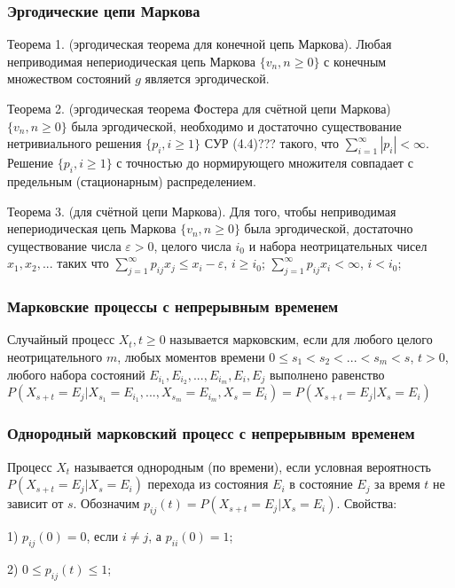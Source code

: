 \subsubsection*{Эргодические цепи Маркова}

Теорема 1. (эргодическая теорема для конечной цепь Маркова). Любая неприводимая непериодическая цепь Маркова $\{v_n, n\geq 0 \}$ с конечным множеством состояний $g$ является эргодической.

Теорема 2. (эргодическая теорема Фостера для счётной цепи Маркова) $\{v_n, n \geq 0 \}$ была эргодической, необходимо и достаточно существование нетривиального решения $\{p_i, i \geq 1 \}$ СУР (4.4)??? такого, что $\sum_{i=1}^\infty |p_i|<\infty$.
Решение $\{p_i, i \geq 1 \}$ с точностью до нормирующего множителя совпадает с предельным (стационарным) распределением.

Теорема 3. (для счётной цепи Маркова). Для того, чтобы  неприводимая непериодическая цепь Маркова $\{v_n, n\geq 0 \}$ была эргодической, достаточно существование числа $\varepsilon > 0$, целого числа $i_0$ и набора неотрицательных чисел $x_1,x_2,...$ таких что
$\sum_{j=1}^\infty p_{ij} x_j \leq x_i - \varepsilon$, $i \geq i_0$;
$\sum_{j=1}^\infty p_{ij} x_i < \infty$, $i < i_0$;

\subsubsection*{Марковские процессы с непрерывным временем}

Случайный процесс $X_t, t \geq 0$ называется марковским, если для любого целого неотрицательного $m$, любых моментов времени $0\leq s_1<s_2<...<s_m<s$, $t>0$, любого набора состояний $E_{i_1}, E_{i_2},...,E_{i_m},E_i, E_j$ выполнено равенство $P(X_{s+t}=E_j | X_{s_1}=E_{i_1}, ..., X_{s_m}=E_{i_m}, X_s=E_i)= P(X_{s+t}=E_j | X_s=E_i)$

\subsubsection*{Однородный марковский процесс с непрерывным временем}

Процесс $X_t$ называется однородным (по времени), если условная вероятность $P(X_{s+t}=E_j|X_s=E_i)$ перехода из состояния $E_i$ в состояние $E_j$ за время $t$ не зависит от $s$.
Обозначим $p_{ij}(t)=P(X_{s+t}=E_j | X_s=E_i)$.
Свойства:

1) $p_{ij}(0)=0$, если $i\ne j$, а $p_{ii}(0)=1$;

2) $0\leq p_{ij}(t)\leq 1$;

